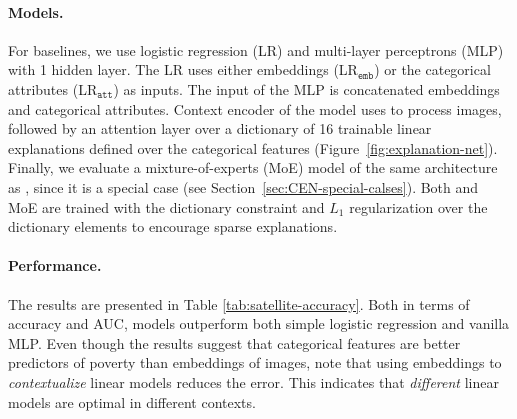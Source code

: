 \documentclass[twoside,11pt]{article}
\begin{document}
\paragraph{Models.}
For baselines, we use logistic regression (LR) and multi-layer perceptrons (MLP) with 1 hidden layer.
The LR uses either {\VGGF} embeddings (LR$_\texttt{emb}$) or the categorical attributes (LR$_\texttt{att}$) as inputs.
The input of the MLP is concatenated {\VGGF} embeddings and categorical attributes.
Context encoder of the {\CEN} model uses {\VGGF} to process images, followed by an attention layer over a dictionary of 16 trainable linear explanations defined over the categorical features (Figure~\ref{fig:explanation-net}).
Finally, we evaluate a mixture-of-experts (MoE) model of the same architecture as {\CEN}, since it is a special case (see Section~\ref{sec:CEN-special-calses}).
Both {\CEN} and MoE are trained with the dictionary constraint and $L_1$ regularization over the dictionary elements to encourage sparse explanations.

\paragraph{Performance.}
The results are presented in Table \ref{tab:satellite-accuracy}.
Both in terms of accuracy and AUC, {\CEN} models outperform both simple logistic regression and vanilla MLP.
Even though the results suggest that categorical features are better predictors of poverty than {\VGGF} embeddings of images, note that using embeddings to \emph{contextualize} linear models reduces the error.
This indicates that \emph{different} linear models are optimal in different contexts.
\end{document}
